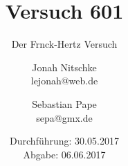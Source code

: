 

\title{Versuch 601}
\subtitle{Der Frnck-Hertz Versuch}
\author{Jonah Nitschke\\
        lejonah@web.de \and
        Sebastian Pape\\
        sepa@gmx.de}
\date{Durchführung: 30.05.2017\\
      Abgabe: 06.06.2017}



\maketitle
\newpage
\setcounter{page}{1}


\newpage


\printbibliography


